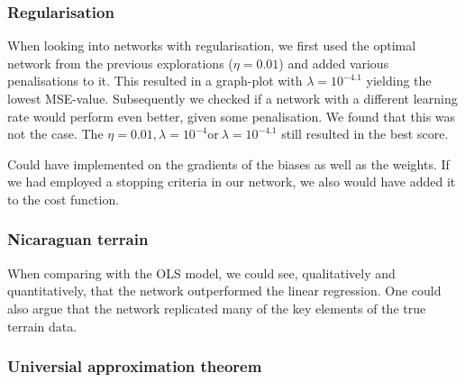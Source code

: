 
        \subsubsection{Regularisation}
            When looking into networks with regularisation, we first used the optimal network from the previous explorations ($\eta = 0.01$) and added various penalisations to it. This resulted in a graph-plot with $\lambda= 10^{-4.1}$ yielding the lowest MSE-value. Subsequently we checked if a network with a different learning rate would perform even better, given some penalisation. We found that this was not the case. The $\eta = 0.01, \lambda = 10^{-4} \text{or} \ \lambda = 10^{-4.1}$ still resulted in the best score. 

            Could have implemented on the gradients of the biases as well as the weights.  If we had employed a stopping criteria in our network, we also would have added it to the cost function. 

        \subsubsection{Nicaraguan terrain}
            When comparing with the OLS model, we could see, qualitatively and quantitatively, that the network outperformed the linear regression. One could also argue that the network replicated many of the key elements of the true terrain data.  
            
        \subsubsection{Universial approximation theorem}

